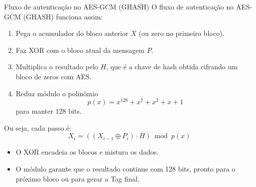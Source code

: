 \begin{frame}{Fluxo de autenticação no AES-GCM (GHASH)}
    O fluxo de autenticação no AES-GCM (GHASH) funciona assim:

    \begin{enumerate}
        \item Pega o acumulador do bloco anterior $X$ (ou zero no primeiro bloco).
        \item Faz XOR com o bloco atual da mensagem $P$.
        \item Multiplica o resultado pelo $H$, que é a chave de hash obtida cifrando um bloco de zeros com AES.
        \item Reduz módulo o polinômio
              \[
                  p(x) = x^{128} + x^7 + x^2 + x + 1
              \]
              para manter 128 bits.
    \end{enumerate}

    Ou seja, cada passo é:
    \[
        X_i = ((X_{i-1} \oplus P_i) \cdot H) \bmod p(x)
    \]

    \begin{itemize}
        \item O XOR encadeia os blocos e mistura os dados.
        \item O módulo garante que o resultado continue com 128 bits, pronto para o próximo bloco ou para gerar a Tag final.
    \end{itemize}
\end{frame}
